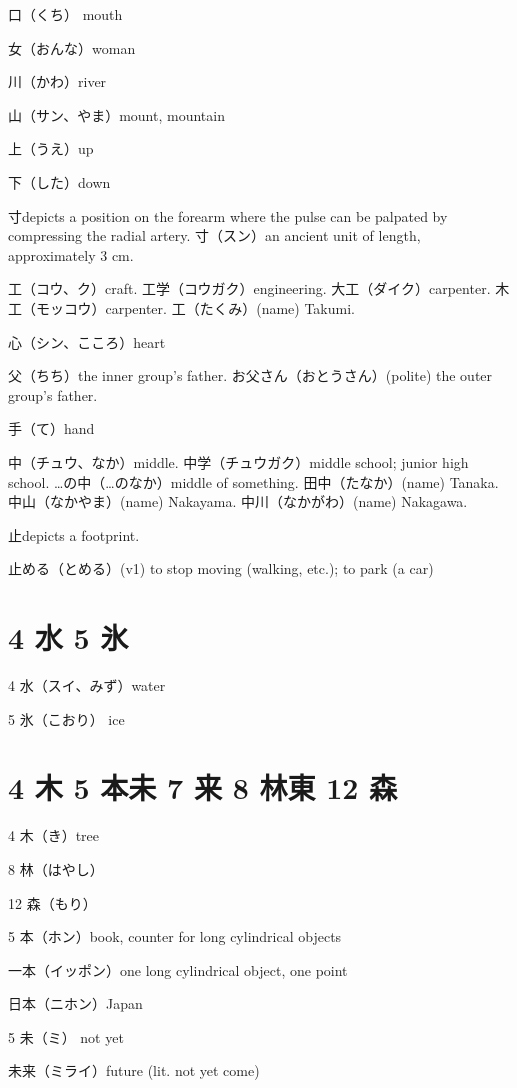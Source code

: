 口（くち） mouth

女（おんな）woman

川（かわ）river

山（サン、やま）mount, mountain

上（うえ）up

下（した）down

寸depicts a position on the forearm
where the pulse can be palpated by compressing the radial artery.
寸（スン）an ancient unit of length, approximately 3 cm.

工（コウ、ク）craft.
工学（コウガク）engineering.
大工（ダイク）carpenter.
木工（モッコウ）carpenter.
工（たくみ）(name) Takumi.

心（シン、こころ）heart

父（ちち）the inner group's father.
お父さん（おとうさん）(polite) the outer group's father.

手（て）hand

中（チュウ、なか）middle.
中学（チュウガク）middle school; junior high school.
…の中（…のなか）middle of something.
田中（たなか）(name) Tanaka.
中山（なかやま）(name) Nakayama.
中川（なかがわ）(name) Nakagawa.

止depicts a footprint.

止める（とめる）(v1) to stop moving (walking, etc.); to park (a car)

\section{4 水 5 氷}

4 水（スイ、みず）water

5 氷（こおり） ice

\section{4 木 5 本未 7 来 8 林東 12 森}

4 木（き）tree

8 林（はやし）

12 森（もり）

5 本（ホン）book, counter for long cylindrical objects

一本（イッポン）one long cylindrical object, one point

日本（ニホン）Japan

5 未（ミ） not yet

未来（ミライ）future (lit. not yet come)


